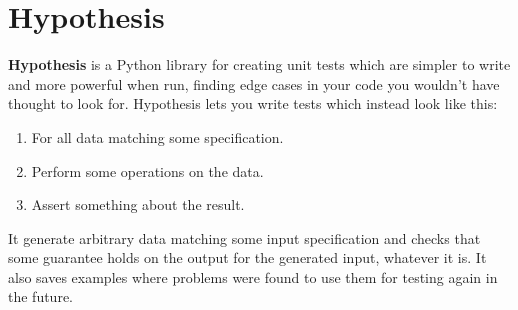\documentclass[12pt]{article}
\begin{document}
\section{{\large Hypothesis}}
{\textbf {Hypothesis} is a Python library for creating unit tests which are simpler to write and more powerful when run, finding edge cases in your code you wouldn’t have thought to look for. 
Hypothesis lets you write tests which instead look like this:
\begin{enumerate}
	\item For all data matching some specification. 
	\item Perform some operations on the data.  
	\item Assert something about the result.
\end{enumerate}
It generate arbitrary data matching some input specification and checks that some guarantee holds on the output for the generated input, whatever it is. It also saves examples where problems were found to use them for testing again in the future.
 

}
\end{document}

